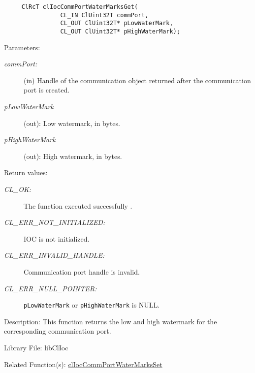 \begin{flushleft}
\begin{Desc}
\footnotesize\begin{verbatim}     ClRcT clIocCommPortWaterMarksGet(
                CL_IN ClUint32T commPort,
                CL_OUT ClUint32T* pLowWaterMark,
                CL_OUT ClUint32T* pHighWaterMark);
\end{verbatim}
\normalsize
\end{Desc}
\begin{Desc}
\item[Parameters:]
\begin{description}
\item[{\em comm\-Port:}](in) Handle of the communication object returned after the communication port is created. \item[{\em p\-Low\-Water\-Mark}](out): 
Low watermark, in bytes. \item[{\em p\-High\-Water\-Mark}](out): High watermark, in bytes.\end{description}
\end{Desc}
\begin{Desc}
\item[Return values:]
\begin{description}
\item[{\em CL\_\-OK:}]The function executed successfully . \item[{\em CL\_\-ERR\_\-NOT\_\-INITIALIZED:}] IOC is not initialized. 
\item[{\em CL\_\-ERR\_\-INVALID\_\-HANDLE:}]Communication port handle is invalid. 
\item[{\em CL\_\-ERR\_\-NULL\_\-POINTER:}]{\tt{p\-Low\-Water\-Mark}} or {\tt{p\-High\-Water\-Mark}} is NULL.\end{description}
\end{Desc}
\begin{Desc}
\item[Description:]This function returns the low and high watermark for the corresponding communication port.
\end{Desc}
\begin{Desc}
\item[Library File:]libClIoc\end{Desc}
\begin{Desc}
\item[Related Function(s):]\hyperlink{pageioc202}{cl\-Ioc\-Comm\-Port\-Water\-Marks\-Set} \end{Desc}
\newpage



\end{flushleft}
